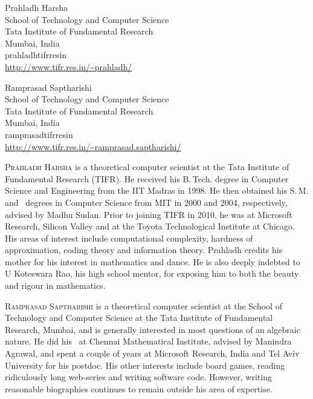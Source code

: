 \documentclass{toc}
\begin{document}
%
%
%
%
%
\begin{tocauthors}
  \begin{tocinfo}[harsha]
  Prahladh Harsha\\
  School of Technology and Computer Science\\
  Tata Institute of Fundamental Research \\
  Mumbai, India\\
  prahladh\tocat{}tifr\tocdot{}res\tocdot{}in\\ %
  \url{http://www.tifr.res.in/~prahladh/}      %
  \end{tocinfo}

  \begin{tocinfo}[saptharishi]
  Ramprasad Saptharishi\\
  School of Technology and Computer Science\\
  Tata Institute of Fundamental Research \\
  Mumbai, India\\
  ramprasad\tocat{}tifr\tocdot{}res\tocdot{}in\\ %
  \url{http://www.tifr.res.in/~ramprasad.saptharishi/}      %
  \end{tocinfo}
\end{tocauthors}
%
%
%
%
%
%
%
%
%
%
%
%
%
%
%
%
%
%
%
%
\begin{tocaboutauthors}
  \begin{tocabout}[harsha]
%
    \textsc{Prahladh Harsha}
    is a theoretical computer scientist at
    the Tata Institute of Fundamental Research (TIFR). He received his
    B.\,Tech. degree in Computer Science and Engineering from the IIT
    Madras in 1998. He then obtained his S.\,M. and \phd\ degrees in
    Computer Science from MIT in 2000 and 2004, respectively, advised
    by %
    Madhu Sudan. Prior to joining TIFR in 2010, he was at
    Microsoft Research, Silicon Valley and at the Toyota Technological
    Institute at Chicago. His areas of interest include computational
    complexity, hardness of approximation, coding theory and
    information theory. Prahladh credits his mother for his interest
    in mathematics and dance. He is also deeply indebted to U
    Koteswara Rao, his high school mentor, for exposing him to both
    the beauty and rigour in mathematics.  %
  \end{tocabout}

  \begin{tocabout}[saptharishi]
    \textsc{Ramprasad Saptharishi} is a theoretical computer scientist
 at the School of Technology and Computer Science at the 
 Tata Institute of Fundamental Research, Mumbai, and is generally interested
 in most questions of an algebraic nature. He did his \phd\ at
 Chennai Mathematical Institute, advised by
%
Manindra Agrawal, and spent a couple of years %
at  %
Microsoft Research, India and Tel Aviv University for his postdoc. 
His other interests include board games, reading ridiculously long 
web-series and writing software code. However, writing reasonable 
biographies continues to remain outside his area of expertise.
  \end{tocabout}
\end{tocaboutauthors}
\end{document}
